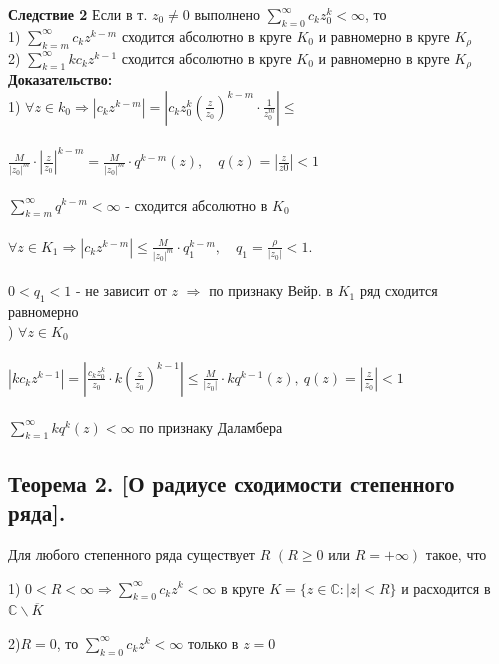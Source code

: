 \documentclass[a4paper,12pt]{article} %
\begin{document}
\textbf{Следствие 2} Если в т. $z_0 \neq 0 $ выполнено $\sum\limits_{k = 0}^\infty c_k z_0^k < \infty $, то \\
1) $\sum\limits_{k = m}^\infty c_k z^{k - m}$ сходится абсолютно в круге $K_0$ и равномерно в круге $K_{\rho}$ \\
2) $\sum\limits_{k = 1}^\infty k c_k z^{k - 1}$ сходится абсолютно в круге $K_0$ и равномерно в круге $K_{\rho}$ \\
\textbf{Доказательство:} \\
1) $\forall z \in k_0 \Rightarrow |c_k z^{k - m} | = |c_k z_0^k \left(\frac{z}{z_0} \right)^{k - m} \cdot \frac{1}{z_0^m} | \leqslant$ \\
\ \\
$
\frac{M}{|z_0|^m} \cdot | \frac{z}{z_0} |^{k-m} = \frac{M}{|z_0|^m} \cdot q^{k - m} (z), \quad q(z) = |\frac{z}{z0}| < 1
$\\
\ \\
$\sum\limits_{k = m}^\infty q^{k - m} < \infty $ - сходится абсолютно в $K_0$\\
\ \\
$ \forall z \in K_1 \Rightarrow |c_k z^{k - m}| \leqslant \frac{M}{|z_0|^m} \cdot q_1^{k - m}, \quad q_1 = \frac{\rho}{|z_0|} < 1.
$\\
\ \\
$0 < q_1 < 1$ - не зависит от $z$ $\Rightarrow$ по признаку Вейр. в $K_1$ ряд сходится равномерно\\
) $\forall z \in K_0$ \\
\ \\
$ |k c_k z^{k-1} | = | \frac{c_k z_0^k}{z_0} \cdot k\left( \frac{z}{z_0} \right)^{k-1} | \leqslant \frac{M}{|z_0|} \cdot  k q^{k - 1}(z), ~q(z) = | \frac{z}{z_0} | < 1 $ \\
\ \\
$ \sum\limits_{k = 1}^\infty k q^k(z) < \infty $ по признаку Даламбера\\
\subsection{Теорема 2. [О радиусе сходимости степенного ряда].}
Для любого степенного ряда существует $R \, \, (R \geqslant 0 \text{ или } R = +\infty)$
такое, что

1) $0 < R < \infty \Rightarrow \sum\limits_{k = 0}^\infty c_k z^k < \infty$ в круге $K = \{ z \in \mathbb{C} : |z| < R\}$ и расходится в $\mathbb{C} \backslash \overline{K}$

2)$R = 0$, то $\sum\limits_{k = 0}^\infty c_k z^k < \infty$ только в $z = 0$
\end{document}
